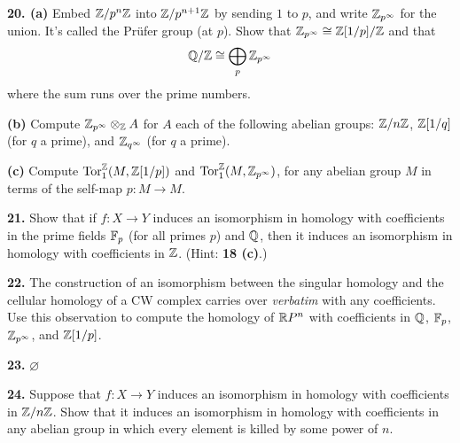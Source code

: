 \documentclass[12pt]{article}
\begin{document}
\medskip
{\bf 20. (a)}
Embed $\mathbb Z/p^n\mathbb Z$ into $\mathbb Z/p^{n+1}\mathbb Z$ by sending $1$ to $p$, 
and write $\mathbb Z_{p^\infty}$ for the union. It's called the Pr\"ufer group (at 
$p$). Show that $\mathbb Z_{p^\infty}\cong\mathbb Z[1/p]/\mathbb Z$ and that 
\[
\mathbb Q/\mathbb Z\cong\bigoplus_p\mathbb Z_{p^\infty}
\]
where the sum runs over the prime numbers. 

{\bf(b)} Compute $\mathbb Z_{p^\infty}\otimes_\mathbb Z A$ for $A$ each of the following
abelian groups: $\mathbb Z/n\mathbb Z$, 
$\mathbb Z[1/q]$ (for $q$ a prime), and $\mathbb Z_{q^\infty}$ (for $q$ a prime). 

{\bf(c)} Compute $\mathrm{Tor}_1^{\mathbb Z}(M,\mathbb Z[1/p])$ and 
$\mathrm{Tor}_1^{\mathbb Z}(M,\mathbb Z_{p^\infty})$, for any abelian group $M$ in terms of the
self-map $p:M\to M$. 

\medskip
{\bf 21.} Show that if $f:X\to Y$ induces an isomorphism in homology 
with coefficients in
the prime fields $\mathbb F_p$ (for all primes $p$) and $\mathbb Q$, then it induces an
isomorphism in homology with coefficients in $\mathbb Z$. 
(Hint: {\bf 18 (c)}.)

\medskip
{\bf 22.} The construction of an isomorphism between the singular homology
and the cellular homology of a CW complex carries over {\em verbatim} with any
coefficients. Use this observation to compute the homology of $\mathbb R P^n$ with
coefficients in $\mathbb Q$, $\mathbb F_p$, $\mathbb Z_{p^\infty}$, and $\mathbb Z[1/p]$. 

\medskip
{\bf 23.} $\varnothing$

\medskip
{\bf 24.} Suppose that $f:X\to Y$ induces an isomorphism in homology with
coefficients in $\mathbb Z/n\mathbb Z$. Show that it induces an isomorphism in homology
with coefficients in any abelian group in which every element is killed by
some power of $n$. 
\end{document}
